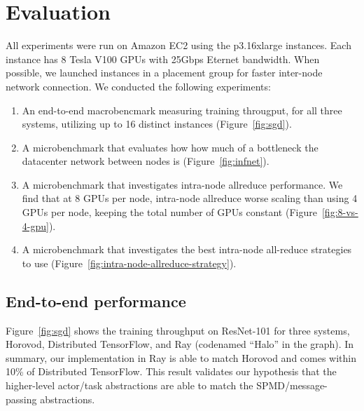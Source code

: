 \section{Evaluation}
All experiments were run on Amazon EC2 using the p3.16xlarge instances.  Each instance has 8 Tesla V100 GPUs with 25Gbps Eternet bandwidth.  When possible, we launched instances in a placement group for faster inter-node network connection.  We conducted the following experiments:

\begin{enumerate}
    \item An end-to-end macrobencmark measuring training througput, for all three systems, utilizing up to 16 distinct instances (Figure~\ref{fig:sgd}).
    \item A microbenchmark that evaluates how how much of a bottleneck the datacenter network between nodes is (Figure~\ref{fig:infnet}).
    \item A microbenchmark that investigates intra-node allreduce performance. We find that at 8 GPUs per node, intra-node allreduce worse scaling than using 4 GPUs per node, keeping the total number of GPUs constant (Figure~\ref{fig:8-vs-4-gpu}).
    \item A microbenchmark that investigates the best intra-node all-reduce strategies to use (Figure~\ref{fig:intra-node-allreduce-strategy}).
\end{enumerate}


\subsection{End-to-end performance}
Figure~\ref{fig:sgd} shows the training throughput on ResNet-101 for three systems, Horovod, Distributed TensorFlow, and Ray (codenamed ``Halo'' in the graph).  In summary, our implementation in Ray is able to match Horovod and comes within 10\% of Distributed TensorFlow.  This result validates our hypothesis that the higher-level actor/task abstractions are able to match the SPMD/message-passing abstractions.

